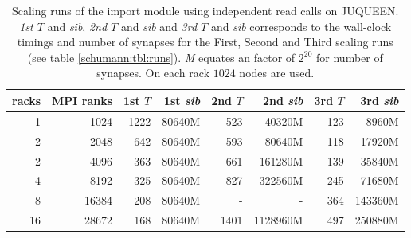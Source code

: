 \begin{table}[h!]
\begin{center}
\begin{tabular}{|r|r|r|r|r|r|r|r|}
\hline
racks & MPI ranks & 1st $T$ & 1st \emph{sib} & 2nd $T$ & 2nd \emph{sib} & 3rd $T$ & 3rd \emph{sib} \\
\hline\hline
1  & 1024      & 1222 & 80640M & 523 & 40320M & 123 & 8960M \\
2  & 2048      & 642 & 80640M  & 593 & 80640M & 118 & 17920M\\
2  & 4096      & 363 & 80640M  & 661 & 161280M & 139 & 35840M\\
4  & 8192     & 325 & 80640M & 827 & 322560M & 245 & 71680M \\
8  & 16384    & 208 & 80640M & -   & - &  364 & 143360M \\
16  & 28672    & 168 & 80640M & 1401 & 1128960M & 497 & 250880M\\
\hline
\end{tabular}
\end{center}
\caption{Scaling runs of the import module using independent read calls on JUQUEEN. \emph{1st $T$} and \emph{sib}, \emph{2nd $T$} and \emph{sib} and
  \emph{3rd $T$} and \emph{sib} corresponds to the wall-clock timings and number of synapses for the First, Second and Third scaling runs (see table \ref{schumann:tbl:runs}). \emph{M} equates an factor of $2^{20}$ for number of synapses. On each rack $1024$ nodes are used.}
\label{schumann:tbl:scalruns}
\end{table}



